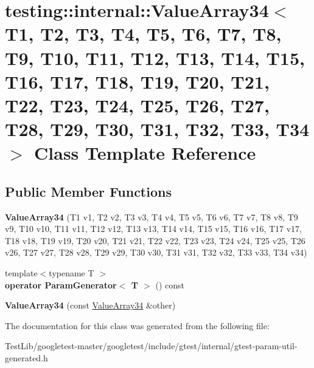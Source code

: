 \hypertarget{classtesting_1_1internal_1_1ValueArray34}{}\section{testing\+:\+:internal\+:\+:Value\+Array34$<$ T1, T2, T3, T4, T5, T6, T7, T8, T9, T10, T11, T12, T13, T14, T15, T16, T17, T18, T19, T20, T21, T22, T23, T24, T25, T26, T27, T28, T29, T30, T31, T32, T33, T34 $>$ Class Template Reference}
\label{classtesting_1_1internal_1_1ValueArray34}
\subsection*{Public Member Functions}
\begin{DoxyCompactItemize}
\item 
\mbox{\label{classtesting_1_1internal_1_1ValueArray34_a25aad9698b9d6fd45743dc86f973be09}} 
{\bfseries Value\+Array34} (T1 v1, T2 v2, T3 v3, T4 v4, T5 v5, T6 v6, T7 v7, T8 v8, T9 v9, T10 v10, T11 v11, T12 v12, T13 v13, T14 v14, T15 v15, T16 v16, T17 v17, T18 v18, T19 v19, T20 v20, T21 v21, T22 v22, T23 v23, T24 v24, T25 v25, T26 v26, T27 v27, T28 v28, T29 v29, T30 v30, T31 v31, T32 v32, T33 v33, T34 v34)
\item 
\mbox{\label{classtesting_1_1internal_1_1ValueArray34_a810547b4fed5bd0e5ed636272ad279b4}} 
{\footnotesize template$<$typename T $>$ }\\{\bfseries operator Param\+Generator$<$ T $>$} () const
\item 
\mbox{\label{classtesting_1_1internal_1_1ValueArray34_aaa146943f507ec601268c5cac4f402a7}} 
{\bfseries Value\+Array34} (const \hyperlink{classtesting_1_1internal_1_1ValueArray34}{Value\+Array34} \&other)
\end{DoxyCompactItemize}


The documentation for this class was generated from the following file\+:\begin{DoxyCompactItemize}
\item 
Test\+Lib/googletest-\/master/googletest/include/gtest/internal/gtest-\/param-\/util-\/generated.\+h\end{DoxyCompactItemize}
